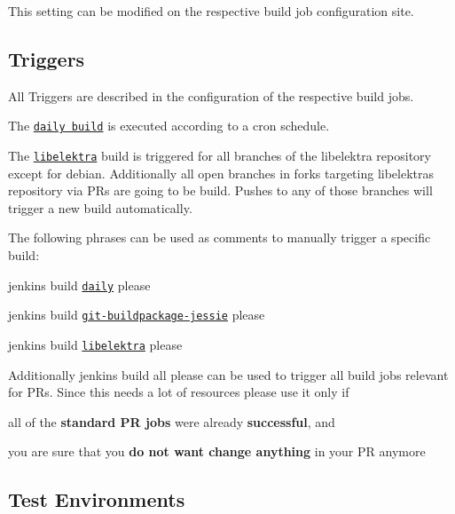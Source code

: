 This setting can be modified on the respective build job configuration site.

\subsection*{Triggers}

All Triggers are described in the configuration of the respective build jobs.

The \href{https://build.libelektra.org/jenkins/job/libelektra-daily/}{\tt daily build} is executed according to a cron schedule.

The \href{https://build.libelektra.org/jenkins/job/libelektra/}{\tt libelektra} build is triggered for all branches of the libelektra repository except for {\ttfamily debian}. Additionally all open branches in forks targeting libelektra\textquotesingle{}s repository via P\+Rs are going to be build. Pushes to any of those branches will trigger a new build automatically.

The following phrases can be used as comments to manually trigger a specific build\+:


\begin{DoxyItemize}
\item jenkins build \href{https://build.libelektra.org/jenkins/job/libelektra-daily/}{\tt daily} please
\item jenkins build \href{https://build.libelektra.org/job/elektra-git-buildpackage-jessie/}{\tt git-\/buildpackage-\/jessie} please
\item jenkins build \href{https://build.libelektra.org/jenkins/job/libelektra/}{\tt libelektra} please
\end{DoxyItemize}

Additionally {\ttfamily jenkins build all please} can be used to trigger all build jobs relevant for PR\textquotesingle{}s. Since this needs a lot of resources please use it only if


\begin{DoxyItemize}
\item all of the {\bfseries standard PR jobs} were already {\bfseries successful}, and
\item you are sure that you {\bfseries do not want change anything} in your PR anymore
\end{DoxyItemize}

\subsection*{Test Environments}

